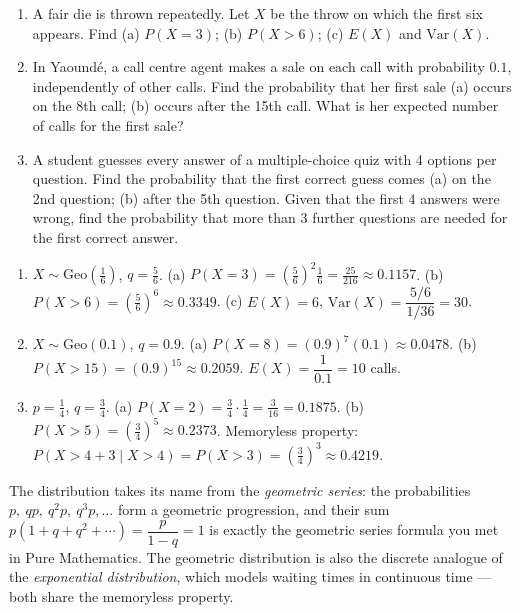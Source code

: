 \documentclass[11pt]{article}
\begin{document}
\begin{exercice}
\begin{enumerate}
\item A fair die is thrown repeatedly. Let $X$ be the throw on which the first six appears. Find (a) $P(X=3)$; (b) $P(X>6)$; (c) $E(X)$ and $\mathrm{Var}(X)$.
\item In Yaound\'e, a call centre agent makes a sale on each call with probability $0.1$, independently of other calls. Find the probability that her first sale (a) occurs on the 8th call; (b) occurs after the 15th call. What is her expected number of calls for the first sale?
\item A student guesses every answer of a multiple-choice quiz with 4 options per question. Find the probability that the first correct guess comes (a) on the 2nd question; (b) after the 5th question. Given that the first 4 answers were wrong, find the probability that more than 3 further questions are needed for the first correct answer.
\end{enumerate}
\end{exercice}

\begin{corrige}[Exercise]
\begin{enumerate}
\item $X\sim\mathrm{Geo}\!\left(\tfrac16\right)$, $q=\tfrac56$. (a) $P(X=3)=\left(\tfrac56\right)^{2}\tfrac16=\tfrac{25}{216}\approx0.1157$. (b) $P(X>6)=\left(\tfrac56\right)^{6}\approx0.3349$. (c) $E(X)=6$, $\mathrm{Var}(X)=\dfrac{5/6}{1/36}=30$.
\item $X\sim\mathrm{Geo}(0.1)$, $q=0.9$. (a) $P(X=8)=(0.9)^{7}(0.1)\approx0.0478$. (b) $P(X>15)=(0.9)^{15}\approx0.2059$. $E(X)=\dfrac{1}{0.1}=10$ calls.
\item $p=\tfrac14$, $q=\tfrac34$. (a) $P(X=2)=\tfrac34\cdot\tfrac14=\tfrac{3}{16}=0.1875$. (b) $P(X>5)=\left(\tfrac34\right)^{5}\approx0.2373$. Memoryless property: $P(X>4+3\mid X>4)=P(X>3)=\left(\tfrac34\right)^{3}\approx0.4219$.
\end{enumerate}
\end{corrige}

\begin{savaistu}
The distribution takes its name from the \emph{geometric series}: the probabilities $p,\ qp,\ q^{2}p,\ q^{3}p,\dots$ form a geometric progression, and their sum $p(1+q+q^{2}+\cdots)=\dfrac{p}{1-q}=1$ is exactly the geometric series formula you met in Pure Mathematics. The geometric distribution is also the discrete analogue of the \emph{exponential distribution}, which models waiting times in continuous time --- both share the memoryless property.
\end{savaistu}
\end{document}

